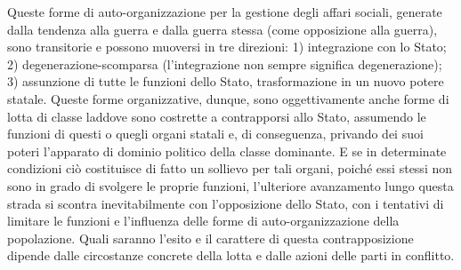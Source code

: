 \documentclass[../main]{subfiles}
\begin{document}
Queste forme di auto-organizzazione per la gestione degli affari sociali, generate dalla tendenza alla guerra e dalla guerra stessa (come opposizione alla guerra), sono transitorie e possono muoversi in tre direzioni: 1) integrazione con lo Stato; 2) degenerazione-scomparsa (l'integrazione non sempre significa degenerazione); 3) assunzione di tutte le funzioni dello Stato, trasformazione in un nuovo potere statale. Queste forme organizzative, dunque, sono oggettivamente anche forme di lotta di classe laddove sono costrette a contrapporsi allo Stato, assumendo le funzioni di questi o quegli organi statali e, di conseguenza, privando dei suoi poteri l'apparato di dominio politico della classe dominante. E se in determinate condizioni ciò costituisce di fatto un sollievo per tali organi, poiché essi stessi non sono in grado di svolgere le proprie funzioni, l'ulteriore avanzamento lungo questa strada si scontra inevitabilmente con l'opposizione dello Stato, con i tentativi di limitare le funzioni e l'influenza delle forme di auto-organizzazione della popolazione. Quali saranno l'esito e il carattere di questa contrapposizione dipende dalle circostanze concrete della lotta e dalle azioni delle parti in conflitto.
\end{document}
